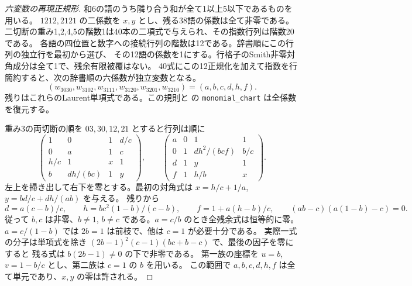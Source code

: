\begin{proof}[六変数の再現正規形]
和6の語のうち隣り合う和が全て1以上5以下であるものを用いる。
$1212,2121$ の二係数を $x,y$ とし、残る38語の係数は全て非零である。
二切断の重み1,2,4,5の階数1は40本の二項式で与えられ、その指数行列は階数20である。
各語の四位置と数字への接続行列の階数は12である。辞書順にこの行列の独立行を最初から選び、
その12語の係数を1にする。行格子のSmith非零対角成分は全て1で、残余有限被覆はない。
40式にこの12正規化を加えて指数を行簡約すると、次の辞書順の六係数が独立変数となる。
\[
 (w_{3030},w_{3102},w_{3111},w_{3120},w_{3201},w_{3210})=(a,b,c,d,h,f).
\]
残りはこれらのLaurent単項式である。この規則と  の
\texttt{monomial\_chart} は全係数を復元する。

重み3の両切断の順を $03,30,12,21$ とすると行列は順に
\[
 \begin{pmatrix}1&0&1&d/c\\0&a&1&c\\h/c&1&x&1\\b&dh/(bc)&1&y\end{pmatrix},
 \qquad
 \begin{pmatrix}a&0&1&1\\0&1&dh^2/(bcf)&b/c\\d&1&y&1\\f&1&h/b&x\end{pmatrix}.
\]
左上を掃き出して右下を零とする。最初の対角式は $x=h/c+1/a$, $y=bd/c+dh/(ab)$ を与える。
残りから
\[
 d=a(c-b)/c,\qquad h=bc^2(1-b)/(c-b),\qquad f=1+a(h-b)/c,
 \qquad (ab-c)(a(1-b)-c)=0 .
\]
従って $b,c$ は非零、$b\ne1$, $b\ne c$ である。$a=c/b$ のとき全残余式は恒等的に零。
$a=c/(1-b)$ では $2b=1$ は前枝で、他は $c=1$ が必要十分である。
実際一式の分子は単項式を除き $(2b-1)^2(c-1)(bc+b-c)$ で、最後の因子を零にすると
残る式は $b(2b-1)\ne0$ の下で非零である。
第一族の座標を $u=b$, $v=1-b/c$ とし、第二族は $c=1$ の $b$ を用いる。
この範囲で $a,b,c,d,h,f$ は全て単元であり、$x,y$ の零は許される。
\end{proof}

